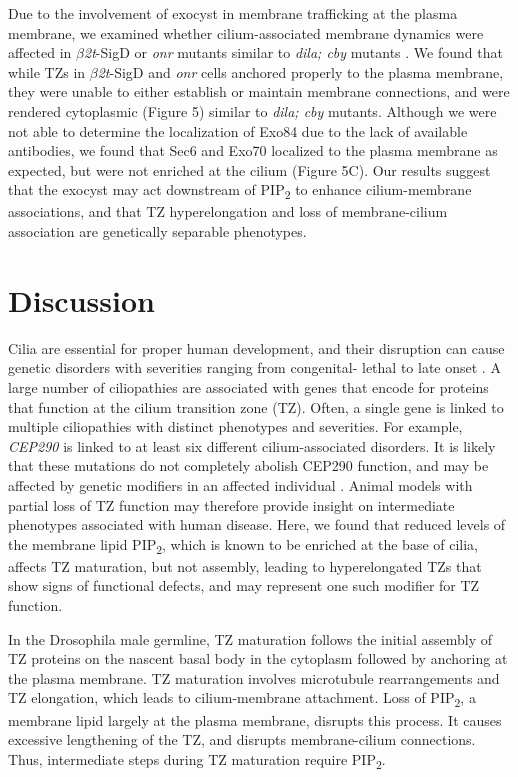 \documentclass[12pt, twoside, letterpaper]{article}
\newcommand{\PIP}{PIP\textsubscript{2}}
\newcommand{\sigd}{$\beta$\textit{2t}-SigD}
\begin{document}
Due to the involvement of exocyst in membrane trafficking at the plasma membrane,
we examined whether cilium-associated membrane dynamics were affected in \sigd{}
or \textit{onr} mutants similar to \textit{dila; cby} mutants
\citep{vieillard2016transition}.
We found that while TZs in \sigd{} and \textit{onr} cells anchored properly
to the plasma membrane, they were unable to either establish or maintain
membrane connections, and were rendered cytoplasmic (Figure 5) similar to
\textit{dila; cby} mutants.
Although we were not able to determine the localization of Exo84 due to the
lack of available antibodies,
we found that Sec6 and Exo70 localized to the plasma membrane as expected,
but were not enriched at the cilium (Figure 5C).
Our results suggest that the exocyst may act downstream of \PIP{} to
enhance cilium-membrane associations, and that TZ hyperelongation and loss of
membrane-cilium association are genetically separable phenotypes.


\section{Discussion}
Cilia are essential for proper human development, and their disruption
can cause genetic disorders with severities ranging from congenital-
lethal \citep{}
to late onset \citep{}.
A large number of ciliopathies are associated with genes that encode for
proteins that function at the cilium transition zone (TZ).
Often, a single gene is linked to multiple ciliopathies with distinct phenotypes
and severities.
For example, \textit{CEP290} is linked to at least six different
cilium-associated disorders.
It is likely that these mutations do not completely abolish CEP290
function, and may be affected by genetic modifiers in an affected individual
\citep{zaghloul2010functional}.
Animal models with partial loss of TZ function may therefore provide
insight on intermediate phenotypes associated with human disease.
Here, we found that reduced levels of the membrane lipid \PIP{},
which is known to be enriched at the base of cilia,
affects TZ maturation, but not assembly,
leading to hyperelongated TZs that show signs of functional defects, and
may represent one such modifier for TZ function.

In the Drosophila male germline, TZ maturation follows the initial
assembly of TZ proteins on the nascent basal body in the cytoplasm
followed by anchoring at the plasma membrane.
TZ maturation involves microtubule rearrangements and TZ elongation,
which leads to cilium-membrane attachment.
Loss of \PIP{}, a membrane lipid largely at the plasma membrane,
disrupts this process.
It causes excessive lengthening of the TZ,
and disrupts membrane-cilium connections.
Thus, intermediate steps during TZ maturation require \PIP{}.
\end{document}
